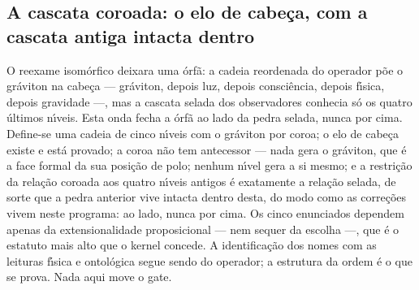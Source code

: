 \documentclass[11pt]{article}
\theoremstyle{definition}\newtheorem{deriv}{Derivação}
\begin{document}
\subsection*{A cascata coroada: o elo de cabe\c{c}a, com a cascata antiga intacta dentro}O reexame isom\'orfico deixara uma \'orf\~a: a cadeia reordenada do operador p\~oe o gr\'aviton na cabe\c{c}a --- gr\'aviton, depois luz, depois consci\^encia, depois f\'\i{}sica, depois gravidade ---, mas a cascata selada dos observadores conhecia s\'o os quatro \'ultimos n\'\i{}veis. Esta onda fecha a \'orf\~a ao lado da pedra selada, nunca por cima. Define-se uma cadeia de cinco n\'\i{}veis com o gr\'aviton por coroa; o elo de cabe\c{c}a existe e est\'a provado; a coroa n\~ao tem antecessor --- nada gera o gr\'aviton, que \'e a face formal da sua posi\c{c}\~ao de polo; nenhum n\'\i{}vel gera a si mesmo; e a restri\c{c}\~ao da rela\c{c}\~ao coroada aos quatro n\'\i{}veis antigos \'e exatamente a rela\c{c}\~ao selada, de sorte que a pedra anterior vive intacta dentro desta, do modo como as corre\c{c}\~oes vivem neste programa: ao lado, nunca por cima. Os cinco enunciados dependem apenas da extensionalidade proposicional --- nem sequer da escolha ---, que \'e o estatuto mais alto que o kernel concede. A identifica\c{c}\~ao dos nomes com as leituras f\'\i{}sica e ontol\'ogica segue sendo do operador; a estrutura da ordem \'e o que se prova. Nada aqui move o gate.
\end{document}
